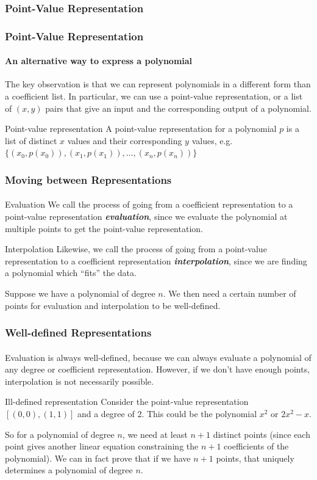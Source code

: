 \documentclass{beamer}                             %
\newcommand{\emphasis}[1]{\textbf{\textit{#1}}}
\begin{document}
\subsubsection[Point-Value]{Point-Value Representation}
\begin{frame}
\frametitle{Point-Value Representation}
\framesubtitle{An alternative way to express a polynomial}
The key observation is that we can represent polynomials in a different form
than a coefficient list. In particular, we can use a \alert{point-value}
representation, or a list of \( (x, y) \) pairs that give an input and the
corresponding output of a polynomial. 
\begin{alertblock}{Point-value representation}
  A point-value representation for a polynomial \( p \) is a list of distinct
  \( x \) values and their corresponding \( y \) values, e.g.
  \( \{(x_0, p(x_0)), (x_1, p(x_1)), \ldots, (x_n, p(x_n)) \}  \)
\end{alertblock}
\end{frame}

\begin{frame}
\frametitle{Moving between Representations}
\framesubtitle{}
\begin{alertblock}{Evaluation}
  We call the process of going from
  a coefficient representation to a point-value representation
  \emphasis{evaluation}, since we evaluate the polynomial at multiple points
  to get the point-value representation.
\end{alertblock} \pause
\begin{alertblock}{Interpolation}
Likewise, we call the process of going from a point-value representation
to a coefficient representation \emphasis{interpolation}, since we are finding
a polynomial which \enquote{fits} the data. 
\end{alertblock} \pause
Suppose we have a polynomial of degree \( n \). We then need
a certain number of points for evaluation and interpolation to be well-defined.
\end{frame}

\begin{frame}
\frametitle{Well-defined Representations}
\framesubtitle{}
Evaluation is always well-defined, because we can always evaluate a polynomial
of any degree or coefficient representation. However, if we don't have
enough points, interpolation is not necessarily possible. \pause 
\begin{exampleblock}{Ill-defined representation}
Consider the point-value representation \( [(0, 0), (1, 1)] \)
and a degree of 2. This could be the polynomial \( x^2 \) or \( 2x^2 - x \).
\end{exampleblock} \pause
So for a polynomial of degree \( n \), we need at least \( n + 1 \)
distinct points (since each point gives another linear equation constraining
the \( n + 1 \) coefficients of the polynomial). 
We can in fact prove that if we have \( n + 1 \) points, that uniquely
determines a polynomial of degree \( n \).
\end{frame}
\end{document}
